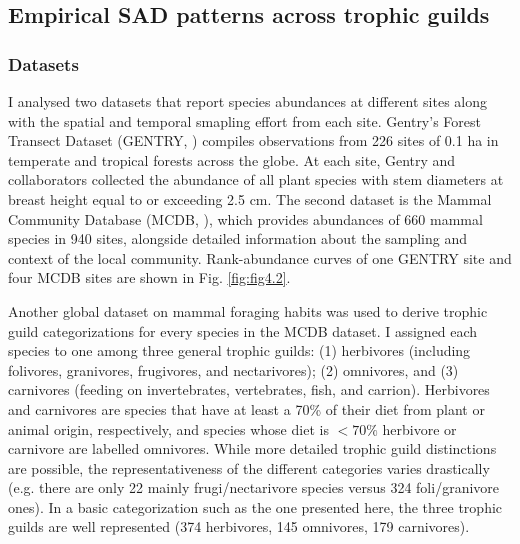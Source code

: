 \subsection*{Empirical SAD patterns across trophic guilds}

\subsubsection*{Datasets}

I analysed two datasets that report species abundances at different sites along with the spatial and temporal smapling effort from each site. Gentry's Forest Transect Dataset (GENTRY, \citealt{Phillips2002}) compiles observations from 226 sites of 0.1 ha in temperate and tropical forests across the globe. At each site, Gentry and collaborators collected the abundance of all plant species with stem diameters at breast height equal to or exceeding 2.5 cm. The second dataset is the Mammal Community Database (MCDB, \citealt{Thibault2011}), which provides abundances of 660 mammal species in 940 sites, alongside detailed information about the sampling and context of the local community. Rank-abundance curves of one GENTRY site and four MCDB sites are shown in Fig. \ref{fig:fig4.2}.

Another global dataset on mammal foraging habits \citep{Wilman2014} was used to derive trophic guild categorizations for every species in the MCDB dataset. I assigned each species to one among three general trophic guilds: (1) herbivores (including folivores, granivores, frugivores, and nectarivores); (2) omnivores, and (3) carnivores (feeding on invertebrates, vertebrates, fish, and carrion). Herbivores and carnivores are species that have at least a 70\% of their diet from plant or animal origin, respectively, and species whose diet is $< 70\%$ herbivore or carnivore are labelled omnivores. While more detailed trophic guild distinctions are possible, the representativeness of the different categories varies drastically (e.g. there are only 22 mainly frugi/nectarivore species versus 324 foli/granivore ones). In a basic categorization such as the one presented here, the three trophic guilds are well represented (374 herbivores, 145 omnivores, 179 carnivores).

